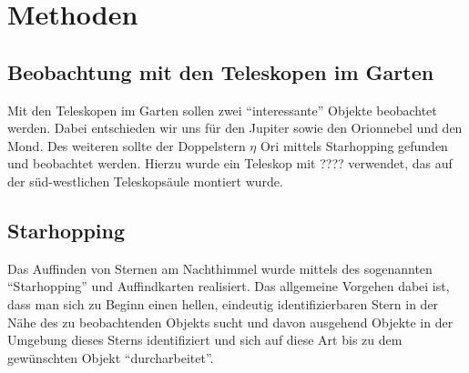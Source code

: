 \section{Methoden}
\subsection{Beobachtung mit den Teleskopen im Garten}
Mit den Teleskopen im Garten sollen zwei \enquote{interessante} Objekte beobachtet werden. Dabei entschieden wir uns für den Jupiter sowie den Orionnebel und den Mond. Des weiteren sollte der Doppelstern $\eta$ Ori mittels Starhopping gefunden und beobachtet werden. Hierzu wurde ein Teleskop mit ???? verwendet, das auf der süd-westlichen Teleskopsäule montiert wurde. 
\subsection{Starhopping}
Das Auffinden von Sternen am Nachthimmel wurde mittels des sogenannten \enquote{Starhopping} und Auffindkarten realisiert. Das allgemeine Vorgehen dabei ist, dass man sich zu Beginn einen hellen, eindeutig identifizierbaren Stern in der Nähe des zu beobachtenden Objekts sucht und davon ausgehend Objekte in der Umgebung dieses Sterns identifiziert und sich auf diese Art bis zu dem gewünschten Objekt \enquote{durcharbeitet}.  

